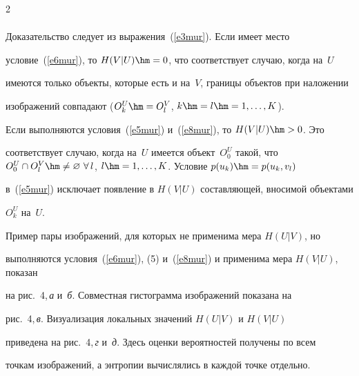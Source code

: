 \begin{multicols}{2}
\begin{multline}
\label{e8mur}


\end{multline}








  


  Доказательство следует из выражения~(\ref{e3mur}). Если имеет место 


условие~(\ref{e6mur}), то $H(V\vert U)\hm=0$, что соответствует случаю, когда на~$U$ 


имеются только объекты, которые есть и на~$V$, границы объектов при наложении 


изображений совпадают ($O_k^U\hm=O_l^V$, $k\hm=l\hm=1, \ldots , K$).


  


  Если выполняются условия~(\ref{e5mur}) и~(\ref{e8mur}), то $H(V\vert U)\hm >0$. Это 


соответствует случаю, когда на~$U$ имеется объект~$O_0^U$ такой, что $O_0^U\cap 


O_l^V\hm\not= \varnothing\ \forall\,l$, $l\hm=1, \ldots ,K$. Условие $p(u_k)\hm=p(u_k,v_l)$ 


в~(\ref{e5mur}) исключает появление в $H(V\vert U)$ составляющей, вносимой объектами 


$O_k^U$ на~$U$.


  


  Пример пары изображений, для которых не применима мера $H(U\vert V)$, но 


выполняются условия~(\ref{e6mur}), (5) и~(\ref{e8mur}) и применима мера $H(V\vert U)$, показан 


на рис.~4,\,\textit{а} и~\textit{б}. Совместная гистограмма изображений показана на 


рис.~4,\,\textit{в}. Визуализация локальных значений $H(U\vert V)$ и $H(V\vert U)$ 


приведена на рис.~4,\,\textit{г} и~\textit{д}. Здесь оценки вероятностей получены по всем 


точкам изоб\-ра\-же\-ний, а энтропии вычислялись в каждой точке отдельно.














\pagebreak





\end{multicols}





